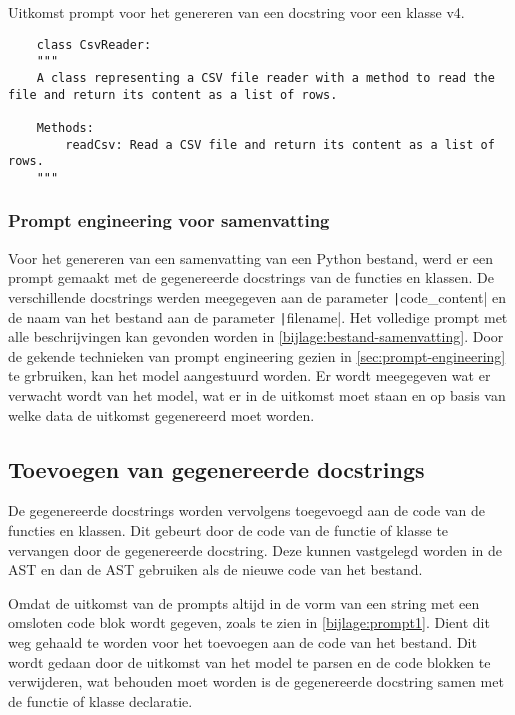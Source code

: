 \begin{listing}
    \caption{Uitkomst prompt voor het genereren van een docstring voor een klasse v4.}
    \label{lst:uitkomst-prompt4}
    \begin{verbatim}
    class CsvReader:
    """
    A class representing a CSV file reader with a method to read the file and return its content as a list of rows.

    Methods:
        readCsv: Read a CSV file and return its content as a list of rows.
    """
    \end{verbatim}
\end{listing}

\subsubsection{Prompt engineering voor samenvatting}
Voor het genereren van een samenvatting van een Python bestand, werd er een prompt gemaakt met de gegenereerde docstrings van de functies en klassen.
De verschillende docstrings werden meegegeven aan de parameter \texttt|code_content| en de naam van het bestand aan de parameter 
\texttt|filename|.
Het volledige prompt met alle beschrijvingen kan gevonden worden in \ref{bijlage:bestand-samenvatting}.
Door de gekende technieken van prompt engineering gezien in \ref{sec:prompt-engineering} te grbruiken, kan het model aangestuurd worden.
Er wordt meegegeven wat er verwacht wordt van het model, wat er in de uitkomst moet staan en op basis van welke data de uitkomst gegenereerd moet worden.

\subsection{Toevoegen van gegenereerde docstrings}
\label{sec:bestanddocumentatie-vervangen}
De gegenereerde docstrings worden vervolgens toegevoegd aan de code van de functies en klassen.
Dit gebeurt door de code van de functie of klasse te vervangen door de gegenereerde docstring.
Deze kunnen vastgelegd worden in de AST en dan de AST gebruiken als de nieuwe code van het bestand.

Omdat de uitkomst van de prompts altijd in de vorm van een string met een omsloten code blok wordt gegeven, zoals te zien in \ref{bijlage:prompt1}.
Dient dit weg gehaald te worden voor het toevoegen aan de code van het bestand. 
Dit wordt gedaan door de uitkomst van het model te parsen en de code blokken te verwijderen, wat behouden moet worden is de gegenereerde docstring samen met de functie of klasse declaratie.

